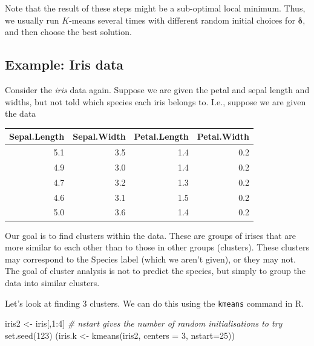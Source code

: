 \documentclass[
]{book}
\newenvironment{Shaded}{\begin{snugshade}}{\end{snugshade}}
\newcommand{\AttributeTok}[1]{\textcolor[rgb]{0.77,0.63,0.00}{#1}}
\newcommand{\CommentTok}[1]{\textcolor[rgb]{0.56,0.35,0.01}{\textit{#1}}}
\newcommand{\DecValTok}[1]{\textcolor[rgb]{0.00,0.00,0.81}{#1}}
\newcommand{\FunctionTok}[1]{\textcolor[rgb]{0.00,0.00,0.00}{#1}}
\newcommand{\NormalTok}[1]{#1}
\newcommand{\OtherTok}[1]{\textcolor[rgb]{0.56,0.35,0.01}{#1}}
\newcommand{\SpecialCharTok}[1]{\textcolor[rgb]{0.00,0.00,0.00}{#1}}
\theoremstyle{definition}
\theoremstyle{definition}
\theoremstyle{definition}
\theoremstyle{definition}
\theoremstyle{remark}
\begin{document}
Note that the result of these steps might be a sub-optimal local minimum. Thus, we usually run \(K\)-means several times with different random initial choices for \(\boldsymbol \delta\), and then choose the best solution.

\hypertarget{example-iris-data}{%
\subsection{Example: Iris data}\label{example-iris-data}}

Consider the \emph{iris} data again. Suppose we are given the petal and sepal length and widths, but not told which species each iris belongs to. I.e., suppose we are given the data

\begin{table}
\centering
\begin{tabular}{rrrr}
\toprule
Sepal.Length & Sepal.Width & Petal.Length & Petal.Width\\
\midrule
5.1 & 3.5 & 1.4 & 0.2\\
4.9 & 3.0 & 1.4 & 0.2\\
4.7 & 3.2 & 1.3 & 0.2\\
4.6 & 3.1 & 1.5 & 0.2\\
5.0 & 3.6 & 1.4 & 0.2\\
\bottomrule
\end{tabular}
\end{table}

Our goal is to find clusters within the data. These are groups of irises that are more similar to each other than to those in other groups (clusters). These clusters may correspond to the Species label (which we aren't given), or they may not. The goal of cluster analysis is not to predict the species, but simply to group the data into similar clusters.

Let's look at finding 3 clusters. We can do this using the \texttt{kmeans} command in R.

\begin{Shaded}
\begin{Highlighting}[]
\NormalTok{iris2 }\OtherTok{\textless{}{-}}\NormalTok{ iris[,}\DecValTok{1}\SpecialCharTok{:}\DecValTok{4}\NormalTok{]}
\CommentTok{\# nstart gives the number of random initialisations to try }
\FunctionTok{set.seed}\NormalTok{(}\DecValTok{123}\NormalTok{)}
\NormalTok{(iris.k }\OtherTok{\textless{}{-}} \FunctionTok{kmeans}\NormalTok{(iris2, }\AttributeTok{centers =} \DecValTok{3}\NormalTok{, }\AttributeTok{nstart=}\DecValTok{25}\NormalTok{)) }
\end{Highlighting}
\end{Shaded}
\end{document}
